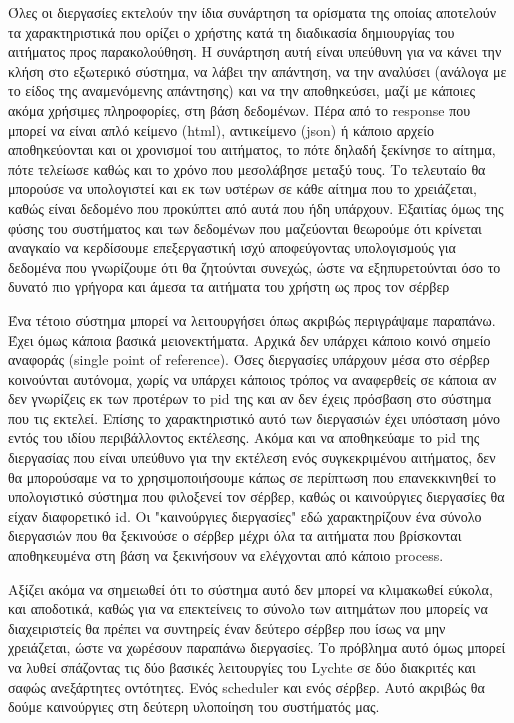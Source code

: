 Όλες οι διεργασίες εκτελούν την ίδια συνάρτηση τα ορίσματα της οποίας αποτελούν τα χαρακτηριστικά που ορίζει ο χρήστης
κατά τη διαδικασία δημιουργίας του αιτήματος προς παρακολούθηση. Η συνάρτηση αυτή είναι υπεύθυνη για να κάνει την κλήση στο εξωτερικό
σύστημα, να λάβει την απάντηση, να την αναλύσει (ανάλογα με το είδος της αναμενόμενης απάντησης) και να την αποθηκεύσει,
μαζί με κάποιες ακόμα χρήσιμες πληροφορίες, στη βάση δεδομένων. Πέρα από το response που μπορεί να είναι απλό κείμενο (html), αντικείμενο (json) ή κάποιο
αρχείο αποθηκεύονται και οι χρονισμοί του αιτήματος, το πότε δηλαδή ξεκίνησε το αίτημα, πότε τελείωσε καθώς και το χρόνο που μεσολάβησε μεταξύ τους. Το τελευταίο
θα μπορούσε να υπολογιστεί και εκ των υστέρων σε κάθε αίτημα που το χρειάζεται, καθώς είναι δεδομένο που προκύπτει από αυτά που ήδη υπάρχουν.
Εξαιτίας όμως της φύσης του συστήματος και των δεδομένων που μαζεύονται
θεωρούμε ότι κρίνεται αναγκαίο να κερδίσουμε επεξεργαστική ισχύ αποφεύγοντας υπολογισμούς
για δεδομένα που γνωρίζουμε ότι θα ζητούνται συνεχώς, ώστε να εξηπυρετούνται όσο το δυνατό
πιο γρήγορα και άμεσα τα αιτήματα του χρήστη ως προς τον σέρβερ

Ένα τέτοιο σύστημα μπορεί να λειτουργήσει όπως ακριβώς περιγράψαμε παραπάνω. Έχει όμως κάποια βασικά μειονεκτήματα.
Αρχικά δεν υπάρχει κάποιο κοινό σημείο αναφοράς (single point of reference). Όσες διεργασίες υπάρχουν μέσα στο σέρβερ κοινούνται αυτόνομα,
χωρίς να υπάρχει κάποιος τρόπος να αναφερθείς σε κάποια αν δεν γνωρίζεις εκ των προτέρων το pid της και αν δεν έχεις πρόσβαση
στο σύστημα που τις εκτελεί. Επίσης το χαρακτηριστικό αυτό των διεργασιών έχει υπόσταση μόνο εντός του ιδίου περιβάλλοντος εκτέλεσης. Ακόμα και
να αποθηκεύαμε το pid της διεργασίας που είναι υπεύθυνο για την εκτέλεση ενός συγκεκριμένου αιτήματος, δεν θα μπορούσαμε να το χρησιμοποιήσουμε
κάπως σε περίπτωση που επανεκκινηθεί το υπολογιστικό σύστημα που φιλοξενεί τον σέρβερ, καθώς οι καινούργιες διεργασίες θα είχαν διαφορετικό id.
Οι "καινούργιες διεργασίες" εδώ χαρακτηρίζουν ένα σύνολο διεργασιών που θα ξεκινούσε ο σέρβερ μέχρι όλα τα αιτήματα που βρίσκονται αποθηκευμένα στη βάση
να ξεκινήσουν να ελέγχονται από κάποιο process.

Αξίζει ακόμα να σημειωθεί ότι το σύστημα αυτό δεν μπορεί να κλιμακωθεί εύκολα, και αποδοτικά, καθώς
για να επεκτείνεις το σύνολο των αιτημάτων που μπορείς να διαχειριστείς θα πρέπει να συντηρείς έναν δεύτερο σέρβερ που ίσως να μην χρειάζεται,
ώστε να χωρέσουν παραπάνω διεργασίες. Το πρόβλημα αυτό όμως μπορεί να λυθεί σπάζοντας τις δύο βασικές λειτουργίες του
Lychte σε δύο διακριτές και σαφώς ανεξάρτητες οντότητες. Ενός scheduler και ενός σέρβερ. Αυτό ακριβώς θα δούμε καινούργιες
στη δεύτερη υλοποίηση του συστήματός μας.

